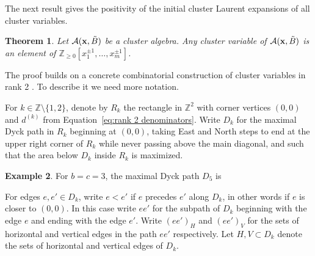 \documentclass{amsart}
\newtheorem{theorem}{Theorem}[section]
\theoremstyle{definition}
\newtheorem{example}[theorem]{Example}
\theoremstyle{remark}
\numberwithin{equation}{section}
\newcommand{\cA}{{\mathcal{A}}}
\newcommand{\bx}{{\bf x}}
\newcommand{\ZZ}{{\mathbb{Z}}}
\begin{document}
  The next result gives the positivity of the initial cluster Laurent expansions of all cluster variables.
  \begin{theorem}\cite{LS15}
    Let $\cA(\bx,\tilde B)$ be a cluster algebra.  Any cluster variable of $\cA(\bx,\tilde B)$ is an element of $\ZZ_{\ge0}[x_1^{\pm1},\ldots,x_m^{\pm1}]$.
  \end{theorem}
  The proof builds on a concrete combinatorial construction of cluster variables in rank 2 \cite{LS13,LLZ14}.  To describe it we need more notation.

  For $k\in\ZZ\setminus\{1,2\}$, denote by $R_k$ the rectangle in $\ZZ^2$ with corner vertices $(0,0)$ and $d^{(k)}$ from Equation~\ref{eq:rank 2 denominators}.  Write $D_k$ for the maximal Dyck path in $R_k$ beginning at $(0,0)$, taking East and North steps to end at the upper right corner of $R_k$ while never passing above the main diagonal, and such that the area below $D_k$ inside $R_k$ is maximized.
  \begin{example}
    For $b=c=3$, the maximal Dyck path $D_5$ is
    \begin{center}
    \end{center}
  \end{example}
  For edges $e,e'\in D_k$, write $e<e'$ if $e$ precedes $e'$ along $D_k$, in other words if $e$ is closer to $(0,0)$.  In this case write $ee'$ for the subpath of $D_k$ beginning with the edge $e$ and ending with the edge $e'$.  Write $(ee')_H$ and $(ee')_V$ for the sets of horizontal and vertical edges in the path $ee'$ respectively.  Let $H,V\subset D_k$ denote the sets of horizontal and vertical edges of $D_k$.
\end{document}
